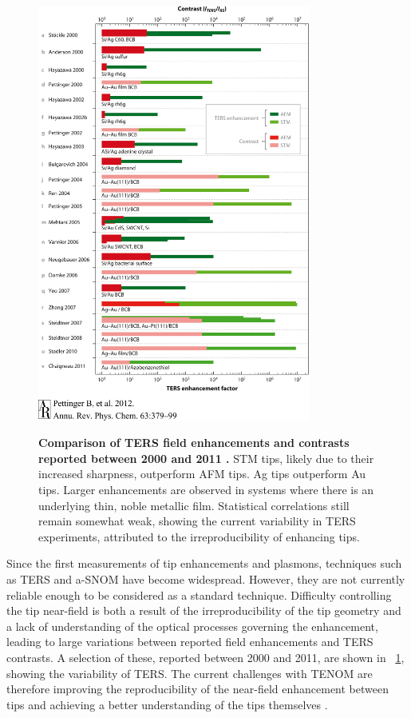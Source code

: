 \documentclass{article}
\begin{document}
\begin{figure}
\centering
{\includegraphics[width=0.8\textwidth, clip=true, trim=0 35 0 0]{figures/literature/pc630379_f8}}
{\caption[Comparison of TERS field enhancements and contrasts reported between 2000 and 2011 \cite{pettinger2012}]{\textbf{Comparison of TERS field enhancements and contrasts reported between 2000 and 2011 \cite{pettinger2012}.} STM tips, likely due to their increased sharpness, outperform AFM tips. Ag tips outperform Au tips. Larger enhancements are observed in systems where there is an underlying thin, noble metallic film. Statistical correlations still remain somewhat weak, showing the current variability in TERS experiments, attributed to the irreproducibility of enhancing tips.}
\label{fig:pettinger2012}}
\end{figure}

Since the first measurements of tip enhancements and plasmons, techniques such as TERS and a-SNOM have become widespread. However, they are not currently reliable enough to be considered as a standard technique. Difficulty controlling the tip near-field is both a result of the irreproducibility of the tip geometry and a lack of understanding of the optical processes governing the enhancement, leading to large variations between reported field enhancements and TERS contrasts. A selection of these, reported between 2000 and 2011, are shown in \figurename~\ref{fig:pettinger2012}, showing the variability of TERS. The current challenges with TENOM are therefore improving the reproducibility of the near-field enhancement between tips \cite{blum2014, kumar2014, mino2014} and achieving a better understanding of the tips themselves \cite{zhang2009}.
\end{document}
